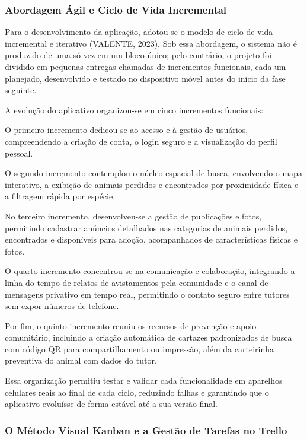 \clearpage

\subsubsection{Abordagem Ágil e Ciclo de Vida Incremental}

Para o desenvolvimento da aplicação, adotou-se o modelo de ciclo de vida incremental e iterativo (VALENTE, 2023). Sob essa abordagem, o sistema não é produzido de uma só vez em um bloco único; pelo contrário, o projeto foi dividido em pequenas entregas chamadas de incrementos funcionais, cada um planejado, desenvolvido e testado no dispositivo móvel antes do início da fase seguinte.

A evolução do aplicativo organizou-se em cinco incrementos funcionais:

O primeiro incremento dedicou-se ao acesso e à gestão de usuários, compreendendo a criação de conta, o login seguro e a visualização do perfil pessoal.

O segundo incremento contemplou o núcleo espacial de busca, envolvendo o mapa interativo, a exibição de animais perdidos e encontrados por proximidade física e a filtragem rápida por espécie.

No terceiro incremento, desenvolveu-se a gestão de publicações e fotos, permitindo cadastrar anúncios detalhados nas categorias de animais perdidos, encontrados e disponíveis para adoção, acompanhados de características físicas e fotos.

O quarto incremento concentrou-se na comunicação e colaboração, integrando a linha do tempo de relatos de avistamentos pela comunidade e o canal de mensagens privativo em tempo real, permitindo o contato seguro entre tutores sem expor números de telefone.

Por fim, o quinto incremento reuniu os recursos de prevenção e apoio comunitário, incluindo a criação automática de cartazes padronizados de busca com código QR para compartilhamento ou impressão, além da carteirinha preventiva do animal com dados do tutor.

Essa organização permitiu testar e validar cada funcionalidade em aparelhos celulares reais ao final de cada ciclo, reduzindo falhas e garantindo que o aplicativo evoluísse de forma estável até a sua versão final.

\clearpage

\subsubsection{O Método Visual Kanban e a Gestão de Tarefas no Trello}

